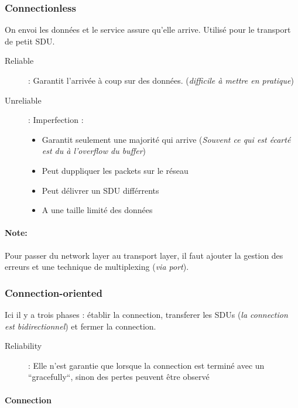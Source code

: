 \subsubsection{Connectionless}
On envoi les données et le service assure qu'elle arrive.
Utilisé pour le transport de petit SDU.

\begin{description}
    \item[Reliable] : Garantit l'arrivée à coup sur des données. (\textit{difficile à mettre en pratique})
    \item[Unreliable] : Imperfection :
        \begin{itemize}
            \item Garantit seulement une majorité qui arrive (\textit{Souvent ce qui est écarté est du à l'overflow du buffer})
            \item Peut duppliquer les packets sur le réseau
            \item Peut délivrer un SDU différrents
            \item A une taille limité des données
        \end{itemize}
\end{description}

\paragraph{Note:} Pour passer du network layer au transport layer, il faut ajouter la
gestion des erreurs et une technique de multiplexing (\textit{via port}).


\subsubsection{Connection-oriented}
Ici il y a trois phases : établir la connection, transferer les SDUs (\textit{la connection est
bidirectionnel}) et fermer la connection.

\begin{description}
    \item[Reliability] : Elle n'est garantie que lorsque la connection est terminé avec un
        ``gracefully``, sinon des pertes peuvent être observé
\end{description}

\paragraph{Connection}

